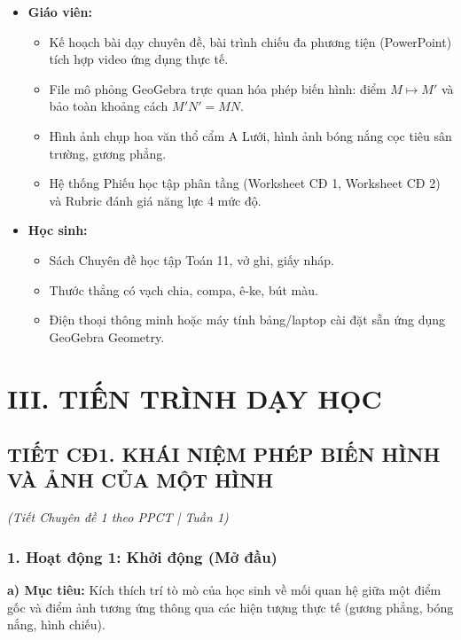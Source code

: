\documentclass[12pt, a4paper]{article}
\begin{document}
\begin{itemize}[leftmargin=1.2cm]
    \item \textbf{Giáo viên:}
    \begin{itemize}[leftmargin=0.6cm]
        \item Kế hoạch bài dạy chuyên đề, bài trình chiếu đa phương tiện (PowerPoint) tích hợp video ứng dụng thực tế.
        \item File mô phỏng GeoGebra trực quan hóa phép biến hình: điểm $M \mapsto M'$ và bảo toàn khoảng cách $M'N' = MN$.
        \item Hình ảnh chụp hoa văn thổ cẩm A Lưới, hình ảnh bóng nắng cọc tiêu sân trường, gương phẳng.
        \item Hệ thống Phiếu học tập phân tầng (Worksheet CĐ 1, Worksheet CĐ 2) và Rubric đánh giá năng lực 4 mức độ.
    \end{itemize}
    \item \textbf{Học sinh:}
    \begin{itemize}[leftmargin=0.6cm]
        \item Sách Chuyên đề học tập Toán 11, vở ghi, giấy nháp.
        \item Thước thẳng có vạch chia, compa, ê-ke, bút màu.
        \item Điện thoại thông minh hoặc máy tính bảng/laptop cài đặt sẵn ứng dụng GeoGebra Geometry.
    \end{itemize}
\end{itemize}

\section*{III. TIẾN TRÌNH DẠY HỌC}

\subsection*{TIẾT CĐ1. KHÁI NIỆM PHÉP BIẾN HÌNH VÀ ẢNH CỦA MỘT HÌNH}
\textit{(Tiết Chuyên đề 1 theo PPCT | Tuần 1)}

\subsubsection*{1. Hoạt động 1: Khởi động (Mở đầu)}
\textbf{a) Mục tiêu:} Kích thích trí tò mò của học sinh về mối quan hệ giữa một điểm gốc và điểm ảnh tương ứng thông qua các hiện tượng thực tế (gương phẳng, bóng nắng, hình chiếu).
\end{document}
